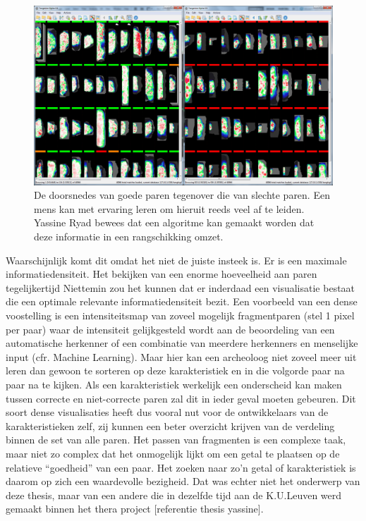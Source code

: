 \begin{figure}[ht]
	\begin{center}
		\includegraphics[width=1.0\columnwidth]{images/tileview-reduced-compare-01.png}
		\caption{De doorsnedes van goede paren tegenover die van slechte paren. Een mens kan met ervaring leren om hieruit reeds veel af te leiden. Yassine Ryad bewees dat een algoritme kan gemaakt worden dat deze informatie in een rangschikking omzet.}
		\label{fig:tileview-reduced-compare}
	\end{center}
\end{figure}

Waarschijnlijk komt dit omdat het niet de juiste insteek is. Er is een maximale informatiedensiteit. Het bekijken van een enorme hoeveelheid aan paren tegelijkertijd Niettemin zou het kunnen dat er inderdaad een visualisatie bestaat die een optimale relevante informatiedensiteit bezit. Een voorbeeld van een dense voostelling is een intensiteitsmap van zoveel mogelijk fragmentparen (stel 1 pixel per paar) waar de intensiteit gelijkgesteld wordt aan de beoordeling van een automatische herkenner of een combinatie van meerdere herkenners en menselijke input (cfr. Machine Learning). Maar hier kan een archeoloog niet zoveel meer uit leren dan gewoon te sorteren op deze karakteristiek en in die volgorde paar na paar na te kijken. Als een karakteristiek werkelijk een onderscheid kan maken tussen correcte en niet-correcte paren zal dit in ieder geval moeten gebeuren. Dit soort dense visualisaties heeft dus vooral nut voor de ontwikkelaars van de karakteristieken zelf, zij kunnen een beter overzicht krijven van de verdeling binnen de set van alle paren. Het passen van fragmenten is een complexe taak, maar niet zo complex dat het onmogelijk lijkt om een getal te plaatsen op de relatieve ``goedheid'' van een paar. Het zoeken naar zo'n getal of karakteristiek is daarom op zich een waardevolle bezigheid. Dat was echter niet het onderwerp van deze thesis, maar van een andere die in dezelfde tijd aan de K.U.Leuven werd gemaakt binnen het thera project [referentie thesis yassine].\\

